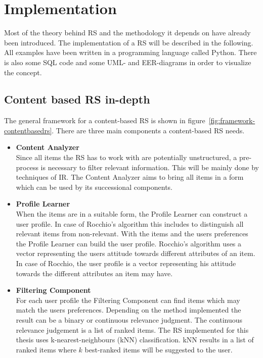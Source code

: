 

\section{Implementation}
Most of the theory behind RS and the methodology it depends on have already been introduced.
The implementation of a RS will be described in the following.
All examples have been written in a programming language called Python.
There is also some SQL code and some UML- and EER-diagrams in order to visualize the concept.

\subsection{Content based RS in-depth}
\label{sec:implementation-contentbased}
The general framework for a content-based RS is shown in figure~\ref{fig:framework-contentbasedrs}.
There are three main components a content-based RS needs.
\begin{itemize}
    \item \textbf{Content Analyzer}\hfill\\
        Since all items the RS has to work with are potentially unstructured, a pre-process is necessary to filter relevant information.
        This will be mainly done by techniques of IR.
        The Content Analyzer aims to bring all items in a form which can be used by its successional components.
        \citep[p.~75-77]{lops:2011}
    \item \textbf{Profile Learner}\hfill\\
        When the items are in a suitable form, the Profile Learner can construct a user profile.
        In case of Rocchio's algorithm this includes to distinguish all relevant items from non-relevant.
        With the items and the users preferences the Profile Learner can build the user profile.
        Rocchio's algorithm uses a vector representing the users attitude towards different attributes of an item.
        In case of Rocchio, the user profile is a vector representing his attitude towards the different attributes an item may have.
        \citep[p.~75-77]{lops:2011}
    \item \textbf{Filtering Component}\hfill\\
        For each user profile the Filtering Component can find items which may match the users preferences.
        Depending on the method implemented the result can be a binary or continuous relevance judgment.
        The continuous relevance judgement is a list of ranked items.
        \citep[p.~75-77]{lops:2011}
        The RS implemented for this thesis uses k-nearest-neighbours (kNN) classification.
        kNN results in a list of ranked items where $k$ best-ranked items will be suggested to the user.
\end{itemize}


